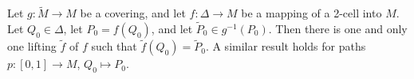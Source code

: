 Let $g: \tilde{M} \rightarrow M$ be a covering, and let $f: \Delta \rightarrow M$ be a mapping of a 2-cell into $M$. Let $Q_0 \in \Delta$, let $P_0 = f(Q_0)$, and let $\tilde{P}_0 \in g^{-1}(P_0)$. Then there is one and only one lifting $\tilde{f}$ of $f$ such that $\tilde{f}(Q_0) = \tilde{P}_0$. A similar result holds for paths $p: [0, 1] \rightarrow M$, $Q_0 \mapsto P_0$.
